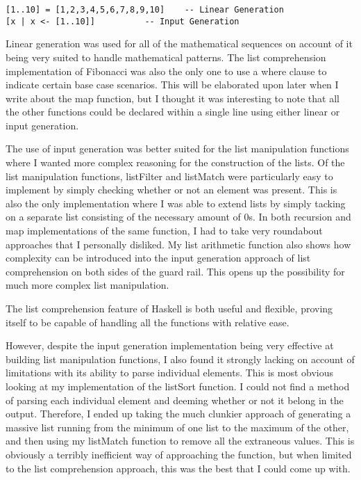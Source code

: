 \documentclass{article}
\theoremstyle{theorem}
\theoremstyle{definition}
\theoremstyle{remark}
\begin{document}
\begin{lstlisting}
[1..10] = [1,2,3,4,5,6,7,8,9,10]	-- Linear Generation
[x | x <- [1..10]]			-- Input Generation
\end{lstlisting}
%
Linear generation was used for all of the mathematical sequences on account of it being very suited to handle mathematical patterns. The list comprehension implementation of Fibonacci was also the only one to use a where clause to indicate certain base case scenarios. This will be elaborated upon later when I write about the map function, but I thought it was interesting to note that all the other functions could be declared within a single line using either linear or input generation.

\medskip\noindent
The use of input generation was better suited for the list manipulation functions where I wanted more complex reasoning for the construction of the lists. Of the list manipulation functions, listFilter and listMatch were particularly easy to implement by simply checking whether or not an element was present. This is also the only implementation where I was able to extend lists by simply tacking on a separate list consisting of the necessary amount of 0s. In both recursion and map implementations of the same function, I had to take very roundabout approaches that I personally disliked. My list arithmetic function also shows how complexity can be introduced into the input generation approach of list comprehension on both sides of the guard rail. This opens up the possibility for much more complex list manipulation.

\medskip\noindent
The list comprehension feature of Haskell is both useful and flexible, proving itself to be capable of handling all the functions with relative ease.

\medskip\noindent
However, despite the input generation implementation being very effective at building list manipulation functions, I also found it strongly lacking on account of limitations with its ability to parse individual elements. This is most obvious looking at my implementation of the listSort function. I could not find a method of parsing each individual element and deeming whether or not it belong in the output. Therefore, I ended up taking the much clunkier approach of generating a massive list running from the minimum of one list to the maximum of the other, and then using my listMatch function to remove all the extraneous values. This is obviously a terribly inefficient way of approaching the function, but when limited to the list comprehension approach, this was the best that I could come up with.
\end{document}
